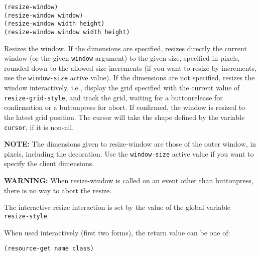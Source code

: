         
{\usagefont\begin{verbatim}
(resize-window)
(resize-window window)
(resize-window width height)
(resize-window window width height)
\end{verbatim}}\usageupspace

Resizes the window. If the dimensions are specified, resizes directly the
current window (or the given \verb"window" argument) to the given size,
specified in pixels, rounded down to the allowed size increments (if you
want to resize by increments, use the \verb"window-size" active value). If
the dimensions are not specified, resizes the window interactively, i.e.,
display the grid specified with the current value of \verb"resize-grid-style",
and track the grid, waiting for a buttonrelease for confirmation or a
buttonpress for abort. If confirmed, the window is resized to the latest
grid position. The cursor will take the shape defined by the variable
\verb"cursor", if it is non-nil.

{\bf NOTE:} The dimensions given to resize-window are those of the outer
window, in pixels, including the {\GWM} decoration. Use the 
\verb"window-size" active value if you want to specify the client dimensions.

{\bf WARNING:} When resize-window is called on an event other than
buttonpress, there is no way to abort the resize.

The interactive resize interaction is set by the value of the global variable
\verb"resize-style"

When used interactively (first two forms), the return value can be one of:


        
{\usagefont\begin{verbatim}
(resource-get name class)
\end{verbatim}}\usageupspace

